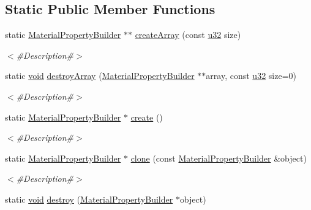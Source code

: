 \subsection*{Static Public Member Functions}
\begin{DoxyCompactItemize}
\item 
static \mbox{\hyperlink{classnjli_1_1_material_property_builder}{Material\+Property\+Builder}} $\ast$$\ast$ \mbox{\hyperlink{classnjli_1_1_material_property_builder_a7d117421edfceed2888f291142723835}{create\+Array}} (const \mbox{\hyperlink{_util_8h_a10e94b422ef0c20dcdec20d31a1f5049}{u32}} size)
\begin{DoxyCompactList}\small\item\em $<$\#\+Description\#$>$ \end{DoxyCompactList}\item 
static \mbox{\hyperlink{_thread_8h_af1e856da2e658414cb2456cb6f7ebc66}{void}} \mbox{\hyperlink{classnjli_1_1_material_property_builder_a8d1b1085258fbf72fef04cc3e7dcfdc0}{destroy\+Array}} (\mbox{\hyperlink{classnjli_1_1_material_property_builder}{Material\+Property\+Builder}} $\ast$$\ast$array, const \mbox{\hyperlink{_util_8h_a10e94b422ef0c20dcdec20d31a1f5049}{u32}} size=0)
\begin{DoxyCompactList}\small\item\em $<$\#\+Description\#$>$ \end{DoxyCompactList}\item 
static \mbox{\hyperlink{classnjli_1_1_material_property_builder}{Material\+Property\+Builder}} $\ast$ \mbox{\hyperlink{classnjli_1_1_material_property_builder_aa218b51e5135a0aabf2b8993ad6bdb3e}{create}} ()
\begin{DoxyCompactList}\small\item\em $<$\#\+Description\#$>$ \end{DoxyCompactList}\item 
static \mbox{\hyperlink{classnjli_1_1_material_property_builder}{Material\+Property\+Builder}} $\ast$ \mbox{\hyperlink{classnjli_1_1_material_property_builder_a3efbcba21da4d8a4908809685974b127}{clone}} (const \mbox{\hyperlink{classnjli_1_1_material_property_builder}{Material\+Property\+Builder}} \&object)
\begin{DoxyCompactList}\small\item\em $<$\#\+Description\#$>$ \end{DoxyCompactList}\item 
static \mbox{\hyperlink{_thread_8h_af1e856da2e658414cb2456cb6f7ebc66}{void}} \mbox{\hyperlink{classnjli_1_1_material_property_builder_a89e5c5f1f121cd2f91e44a3c757db275}{destroy}} (\mbox{\hyperlink{classnjli_1_1_material_property_builder}{Material\+Property\+Builder}} $\ast$object)

\end{DoxyCompactItemize}
